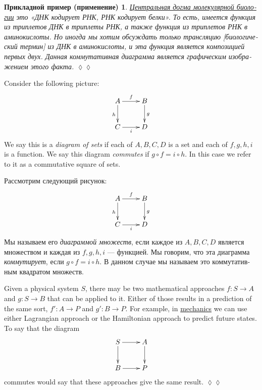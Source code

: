 \documentclass[a4paper]{book}
\def\to{\rightarrow}
\def\taking{\colon}
\theoremstyle{myth}
\newtheorem{appENG}[envENG]{\begin{english}Application\end{english}}
\newenvironment{applicationENG}{\begin{appENG}}{\hspace*{\fill}$\lozenge\lozenge$\end{appENG}}
\newtheorem{appRUS}[envRUS]{Прикладной пример (применение)}
\newenvironment{applicationRUS}{\begin{appRUS}}{\hspace*{\fill}$\lozenge\lozenge$\end{appRUS}}
\begin{document}
\begin{russian}
\begin{applicationRUS}
\href{https://ru.wikipedia.org/wiki/%D0%A6%D0%B5%D0%BD%D1%82%D1%80%D0%B0%D0%BB%D1%8C%D0%BD%D0%B0%D1%8F_%D0%B4%D0%BE%D0%B3%D0%BC%D0%B0_%D0%BC%D0%BE%D0%BB%D0%B5%D0%BA%D1%83%D0%BB%D1%8F%D1%80%D0%BD%D0%BE%D0%B9_%D0%B1%D0%B8%D0%BE%D0%BB%D0%BE%D0%B3%D0%B8%D0%B8}{\text Центральная догма молекулярной биологии} это «ДНК кодирует РНК, РНК кодирует белки». То есть, имеется функция из триплетов ДНК в триплеты РНК, а также функция из триплетов РНК в аминокислоты. Но иногда мы хотим обсуждать только трансляцию [биологический термин] из ДНК в аминокислоты, и эта функция является композицией первых двух. Данная коммутативная диаграмма является графическим изображением этого факта.
\end{applicationRUS}

Consider the following picture:
$$\xymatrix{A\ar[r]^f\ar[d]_h&B\ar[d]^g\\C\ar[r]_i&D}$$
We say this is a {\em diagram of sets} if each of $A,B,C,D$ is a set and each of $f,g,h,i$ is a function. We say this diagram {\em commutes} if $g\circ f=i\circ h$. In this case we refer to it as a commutative square of sets.
 
Рассмотрим следующий рисунок:
$$\xymatrix{A\ar[r]^f\ar[d]_h&B\ar[d]^g\\C\ar[r]_i&D}$$
Мы называем его {\em диаграммой множеств}, если каждое из $A,B,C,D$ является множеством и каждая из $f,g,h,i$ — функцией. Мы говорим, что эта диаграмма {\em коммутирует}, если $g\circ f=i\circ h$. В данном случае мы называем это коммутативным квадратом множеств.

\begin{applicationENG}
Given a physical system $S$, there may be two mathematical approaches $f\taking S\to A$ and $g\taking S\to B$ that can be applied to it. Either of those results in a prediction of the same sort, $f'\taking A\to P$ and $g'\taking B\to P$. For example, in \href{http://en.wikipedia.org/wiki/Hamiltonian_mechanics#As_a_reformulation_of_Lagrangian_mechanics}{\text mechanics} we can use either Lagrangian approach or the Hamiltonian approach to predict future states. To say that the diagram 
$$
\xymatrix{S\ar[r]\ar[d]&A\ar[d]\\B\ar[r]&P}
$$
commutes would say that these approaches give the same result.
\end{applicationENG}


\end{russian}
\end{document}
